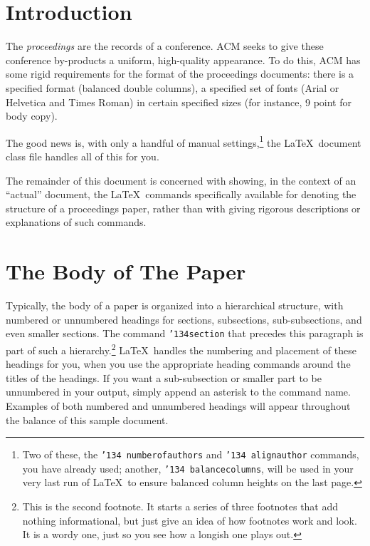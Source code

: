 \documentclass[sigconf]{nimepaper}
\begin{document}
\maketitle

\section{Introduction}
The \textit{proceedings} are the records of a conference.
ACM seeks to give these conference by-products a uniform,
high-quality appearance.  To do this, ACM has some rigid
requirements for the format of the proceedings documents: there
is a specified format (balanced  double columns), a specified
set of fonts (Arial or Helvetica and Times Roman) in
certain specified sizes (for instance, 9 point for body copy).

The good news is, with only a handful of manual
settings,\footnote{Two of these, the {\texttt{\char'134 numberofauthors}}
and {\texttt{\char'134 alignauthor}} commands, you have
already used; another, {\texttt{\char'134 balancecolumns}}, will
be used in your very last run of \LaTeX\ to ensure
balanced column heights on the last page.} the \LaTeX\ document
class file handles all of this for you.

The remainder of this document is concerned with showing, in
the context of an ``actual'' document, the \LaTeX\ commands
specifically available for denoting the structure of a
proceedings paper, rather than with giving rigorous descriptions
or explanations of such commands.

\section{The Body of The Paper}
Typically, the body of a paper is organized
into a hierarchical structure, with numbered or unnumbered
headings for sections, subsections, sub-subsections, and even
smaller sections.  The command \texttt{{\char'134}section} that
precedes this paragraph is part of such a
hierarchy.\footnote{This is the second footnote.  It
starts a series of three footnotes that add nothing
informational, but just give an idea of how footnotes work
and look. It is a wordy one, just so you see
how a longish one plays out.} \LaTeX\ handles the numbering
and placement of these headings for you, when you use
the appropriate heading commands around the titles
of the headings.  If you want a sub-subsection or
smaller part to be unnumbered in your output, simply append an
asterisk to the command name.  Examples of both
numbered and unnumbered headings will appear throughout the
balance of this sample document.
\end{document}
